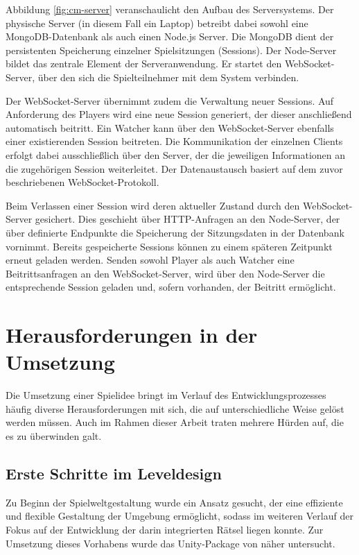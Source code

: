 Abbildung \ref{fig:cm-server} veranschaulicht den Aufbau des Serversystems. Der physische Server (in diesem Fall ein Laptop) betreibt dabei sowohl eine MongoDB-Datenbank als auch einen Node.js Server. Die MongoDB dient der persistenten Speicherung einzelner Spielsitzungen (Sessions). Der Node-Server bildet das zentrale Element der Serveranwendung. Er startet den WebSocket-Server, über den sich die Spielteilnehmer mit dem System verbinden.

Der WebSocket-Server übernimmt zudem die Verwaltung neuer Sessions. Auf Anforderung des Players wird eine neue Session generiert, der dieser anschließend automatisch beitritt. Ein Watcher kann über den WebSocket-Server ebenfalls einer existierenden Session beitreten. Die Kommunikation der einzelnen Clients erfolgt dabei ausschließlich über den Server, der die jeweiligen Informationen an die zugehörigen Session weiterleitet. Der Datenaustausch basiert auf dem zuvor beschriebenen WebSocket-Protokoll.

Beim Verlassen einer Session wird deren aktueller Zustand durch den WebSocket-Server gesichert. Dies geschieht über \ac{HTTP}-Anfragen an den Node-Server, der über definierte Endpunkte die Speicherung der Sitzungsdaten in der Datenbank vornimmt. Bereits gespeicherte Sessions können zu einem späteren Zeitpunkt erneut geladen werden. Senden sowohl Player als auch Watcher eine Beitrittsanfragen an den WebSocket-Server, wird über den Node-Server die entsprechende Session geladen und, sofern vorhanden, der Beitritt ermöglicht.

\section{Herausforderungen in der Umsetzung}\label{sec:difficulties}

Die Umsetzung einer Spielidee bringt im Verlauf des Entwicklungsprozesses häufig diverse Herausforderungen mit sich, die auf unterschiedliche Weise gelöst werden müssen. Auch im Rahmen dieser Arbeit traten mehrere Hürden auf, die es zu überwinden galt.

\subsection{Erste Schritte im Leveldesign}

Zu Beginn der Spielweltgestaltung wurde ein Ansatz gesucht, der eine effiziente und flexible Gestaltung der Umgebung ermöglicht, sodass im weiteren Verlauf der Fokus auf der Entwicklung der darin integrierten Rätsel liegen konnte. Zur Umsetzung dieses Vorhabens wurde das Unity-Package von \cite{alasl_autolevel_2022} näher untersucht.

